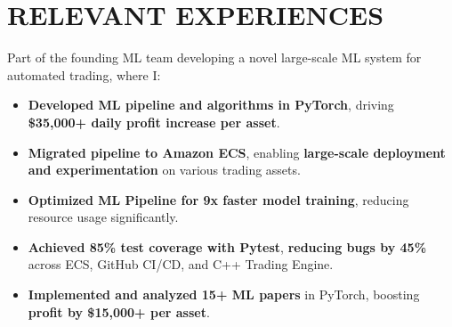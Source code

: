 \section{RELEVANT EXPERIENCES}

{
}
Part of the founding ML team developing a novel large-scale ML system for automated trading, where I:
\begin{itemize}
    \item \textbf{Developed ML pipeline and algorithms in PyTorch}, driving \textbf{\$35,000+ daily profit increase per asset}.
    \item \textbf{Migrated pipeline to Amazon ECS}, enabling \textbf{large-scale deployment and experimentation} on various trading assets.
    \item \textbf{Optimized ML Pipeline for 9x faster model training}, reducing resource usage significantly.
    \item  \textbf{Achieved 85\% test coverage with Pytest}, \textbf{reducing bugs by 45\%} across ECS, GitHub CI/CD, and C++ Trading Engine.
    \item \textbf{Implemented and analyzed 15+ ML papers} in PyTorch, boosting \textbf{profit by \$15,000+ per asset}.
\end{itemize}

